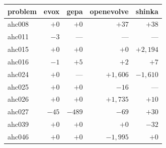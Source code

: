 \begin{tabular}{lrrrr}
\toprule
problem & evox & gepa & openevolve & shinka \\
\midrule
ahc008 & $+0$ & $+0$ & $+37$ & $+38$ \\
ahc011 & \textbf{$-3$} & --- & --- & --- \\
ahc015 & $+0$ & $+0$ & $+0$ & $+2{,}194$ \\
ahc016 & \textbf{$-1$} & $+5$ & $+2$ & $+7$ \\
ahc024 & $+0$ & --- & $+1{,}606$ & \textbf{$-1{,}610$} \\
ahc025 & $+0$ & $+0$ & \textbf{$-16$} & --- \\
ahc026 & $+0$ & $+0$ & $+1{,}735$ & $+10$ \\
ahc027 & \textbf{$-45$} & \textbf{$-489$} & \textbf{$-69$} & $+30$ \\
ahc039 & $+0$ & $+0$ & $+0$ & \textbf{$-32$} \\
ahc046 & $+0$ & $+0$ & \textbf{$-1{,}995$} & $+0$ \\
\bottomrule
\end{tabular}
